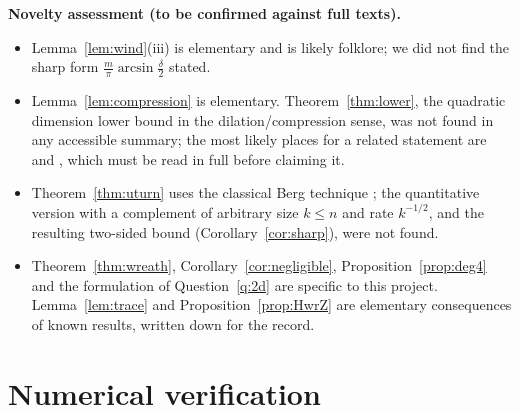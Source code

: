 \documentclass[11pt]{amsart}
\theoremstyle{definition}
\theoremstyle{remark}
\begin{document}
\textbf{Novelty assessment (to be confirmed against full texts).}
\begin{itemize}[leftmargin=2em]
\item Lemma~\ref{lem:wind}(iii) is elementary and is likely folklore; we did not find the sharp form $\frac m\pi\arcsin\frac\delta2$ stated.
\item Lemma~\ref{lem:compression} is elementary. Theorem~\ref{thm:lower}, the quadratic dimension lower bound in the dilation/compression sense, was not found in any accessible summary; the most likely places for a related statement are \cite{LS26} and \cite{Has09}, which must be read in full before claiming it.
\item Theorem~\ref{thm:uturn} uses the classical Berg technique \cite{Berg71,Dav85,Lor88,EL89}; the quantitative version with a complement of arbitrary size $k\le n$ and rate $k^{-1/2}$, and the resulting two-sided bound (Corollary~\ref{cor:sharp}), were not found.
\item Theorem~\ref{thm:wreath}, Corollary~\ref{cor:negligible}, Proposition~\ref{prop:deg4} and the formulation of Question~\ref{q:2d} are specific to this project. Lemma~\ref{lem:trace} and Proposition~\ref{prop:HwrZ} are elementary consequences of known results, written down for the record.
\end{itemize}

\appendix
\section{Numerical verification}\label{app:num}
\end{document}
